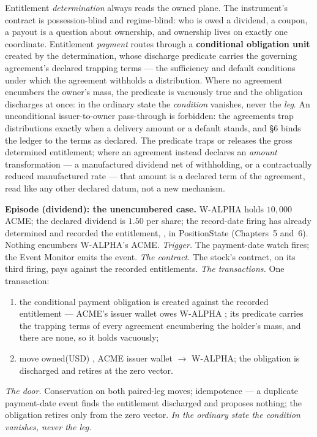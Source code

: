 Entitlement \emph{determination} always reads the owned plane. The
instrument's contract is possession-blind and regime-blind: who is owed a
dividend, a coupon, a payout is a question about ownership, and ownership
lives on exactly one coordinate. Entitlement \emph{payment} routes through a
\textbf{conditional obligation unit} created by the determination, whose
discharge predicate carries the governing agreement's declared trapping terms
--- the sufficiency and default conditions under which the agreement withholds
a distribution. Where no agreement encumbers the owner's mass, the predicate
is vacuously true and the obligation discharges at once: in the ordinary state
the \emph{condition} vanishes, never the \emph{leg}. An unconditional
issuer-to-owner pass-through is forbidden: the agreements trap distributions
exactly when a delivery amount or a default stands, and \S6 binds the ledger
to the terms as declared. The predicate traps or releases the gross determined
entitlement; where an agreement instead declares an \emph{amount} transformation
--- a manufactured dividend net of withholding, or a contractually reduced
manufactured rate --- that amount is a declared term of the agreement, read like
any other declared datum, not a new mechanism.

\medskip\noindent\textbf{Episode (dividend): the unencumbered case.}
W-ALPHA holds $10{,}000$ ACME; the declared dividend is $1.50$ per share; the
record-date firing has already determined and recorded the entitlement,
, in PositionState (Chapters~5 and~6). Nothing encumbers
W-ALPHA's ACME.
\emph{Trigger.} The payment-date watch fires; the Event Monitor emits the
event.
\emph{The contract.} The stock's contract, on its third firing, pays against
the recorded entitlements.
\emph{The transactions.} One transaction:
\begin{enumerate}[label=(\arabic*),nosep]
\item the conditional payment obligation is created against the recorded
entitlement --- ACME's issuer wallet owes W-ALPHA ; its predicate
carries the trapping terms of every agreement encumbering the holder's mass,
and there are none, so it holds vacuously;
\item move owned(USD) , ACME issuer wallet $\to$ W-ALPHA; the
obligation is discharged and retires at the zero vector.
\end{enumerate}
\emph{The door.} Conservation on both paired-leg moves; idempotence --- a
duplicate payment-date event finds the entitlement discharged and proposes
nothing; the obligation retires only from the zero vector.
\emph{In the ordinary state the condition vanishes, never the leg.}

